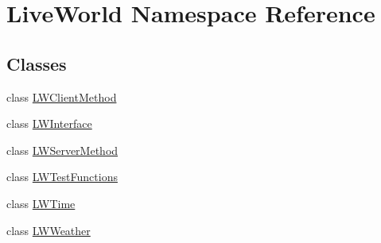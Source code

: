\hypertarget{namespace_live_world}{}\section{Live\+World Namespace Reference}
\label{namespace_live_world}
\subsection*{Classes}
\begin{DoxyCompactItemize}
\item 
class \hyperlink{class_live_world_1_1_l_w_client_method}{L\+W\+Client\+Method}
\item 
class \hyperlink{class_live_world_1_1_l_w_interface}{L\+W\+Interface}
\item 
class \hyperlink{class_live_world_1_1_l_w_server_method}{L\+W\+Server\+Method}
\item 
class \hyperlink{class_live_world_1_1_l_w_test_functions}{L\+W\+Test\+Functions}
\item 
class \hyperlink{class_live_world_1_1_l_w_time}{L\+W\+Time}
\item 
class \hyperlink{class_live_world_1_1_l_w_weather}{L\+W\+Weather}
\end{DoxyCompactItemize}
